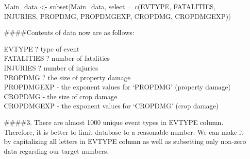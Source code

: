 \documentclass[
]{article}
\newenvironment{Shaded}{\begin{snugshade}}{\end{snugshade}}
\newcommand{\AttributeTok}[1]{\textcolor[rgb]{0.77,0.63,0.00}{#1}}
\newcommand{\CommentTok}[1]{\textcolor[rgb]{0.56,0.35,0.01}{\textit{#1}}}
\newcommand{\DecValTok}[1]{\textcolor[rgb]{0.00,0.00,0.81}{#1}}
\newcommand{\FunctionTok}[1]{\textcolor[rgb]{0.00,0.00,0.00}{#1}}
\newcommand{\NormalTok}[1]{#1}
\newcommand{\OtherTok}[1]{\textcolor[rgb]{0.56,0.35,0.01}{#1}}
\newcommand{\SpecialCharTok}[1]{\textcolor[rgb]{0.00,0.00,0.00}{#1}}
\begin{document}
\begin{Shaded}
\begin{Highlighting}[]
\NormalTok{Main\_data }\OtherTok{\textless{}{-}} \FunctionTok{subset}\NormalTok{(Main\_data, }\AttributeTok{select =} \FunctionTok{c}\NormalTok{(EVTYPE, FATALITIES, INJURIES, PROPDMG, PROPDMGEXP, CROPDMG, CROPDMGEXP))}
\end{Highlighting}
\end{Shaded}

\#\#\#\#Contents of data now are as follows:

EVTYPE ? type of event\\
FATALITIES ? number of fatalities\\
INJURIES ? number of injuries\\
PROPDMG ? the size of property damage\\
PROPDMGEXP - the exponent values for `PROPDMG' (property damage)\\
CROPDMG - the size of crop damage\\
CROPDMGEXP - the exponent values for `CROPDMG' (crop damage)

\#\#\#\#3. There are almost 1000 unique event types in EVTYPE column.
Therefore, it is better to limit database to a reasonable number. We can
make it by capitalizing all letters in EVTYPE column as well as
subsetting only non-zero data regarding our target numbers.

\begin{Shaded}
\end{Shaded}
\end{document}
